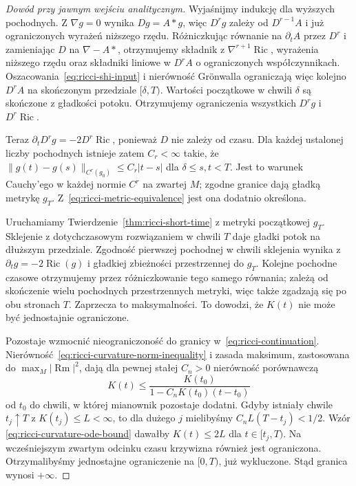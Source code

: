 \begin{proof}[Dowód przy jawnym wejściu analitycznym]
Wyjaśnijmy indukcję dla wyższych pochodnych. Z $\nabla g=0$
wynika $Dg=A*g$, więc $D^rg$ zależy od $D^{r-1}A$
i już ograniczonych wyrażeń niższego rzędu. Różniczkując
równanie na $\partial_tA$ przez $D^r$ i zamieniając $D$
na $\nabla-A*$, otrzymujemy składnik z
$\nabla^{r+1}\operatorname{Ric}$, wyrażenia niższego rzędu
oraz składniki liniowe w $D^rA$ o ograniczonych
współczynnikach. Oszacowania~\eqref{eq:ricci-shi-input}
i nierówność Grönwalla ograniczają więc kolejno
$D^rA$ na skończonym przedziale $[\delta,T)$.
Wartości początkowe w chwili $\delta$ są skończone
z gładkości potoku. Otrzymujemy ograniczenia wszystkich
$D^rg$ i $D^r\operatorname{Ric}$.

Teraz $\partial_tD^rg=-2D^r\operatorname{Ric}$, ponieważ
$D$ nie zależy od czasu. Dla każdej ustalonej liczby
pochodnych istnieje zatem $C_r<\infty$ takie, że
$\|g(t)-g(s)\|_{C^r(g_0)}\leq C_r|t-s|$ dla
$\delta\leq s,t<T$. Jest to warunek Cauchy'ego w każdej
normie $C^r$ na zwartej $M$; zgodne granice dają
gładką metrykę $g_T$. Z~\eqref{eq:ricci-metric-equivalence}
jest ona dodatnio określona.

Uruchamiamy Twierdzenie~\ref{thm:ricci-short-time}
z metryki początkowej $g_T$. Sklejenie z
dotychczasowym rozwiązaniem w chwili $T$
daje gładki potok na dłuższym przedziale. Zgodność
pierwszej pochodnej w chwili sklejenia wynika z
$\partial_tg=-2\operatorname{Ric}(g)$ i gładkiej
zbieżności przestrzennej do $g_T$. Kolejne pochodne
czasowe otrzymujemy przez różniczkowanie tego samego
równania; zależą od skończenie wielu pochodnych
przestrzennych metryki, więc także zgadzają się
po obu stronach $T$.
Zaprzecza to maksymalności. To dowodzi, że
$K(t)$ nie może być jednostajnie ograniczone.

Pozostaje wzmocnić nieograniczoność do
granicy w~\eqref{eq:ricci-continuation}.
Nierówność~\eqref{eq:ricci-curvature-norm-inequality}
i zasada maksimum, zastosowana do
$\max_M|\operatorname{Rm}|^2$, dają dla
pewnej stałej $C_n>0$ nierówność porównawczą
\begin{equation}\label{eq:ricci-curvature-ode-bound}
 K(t)\leq
 \frac{K(t_0)}
      {1-C_nK(t_0)(t-t_0)}
\end{equation}
od $t_0$ do chwili, w której mianownik
pozostaje dodatni. Gdyby istniały chwile
$t_j\uparrow T$ z $K(t_j)\leq L<\infty$,
to dla dużego $j$ mielibyśmy
$C_nL(T-t_j)<1/2$. Wzór
\eqref{eq:ricci-curvature-ode-bound}
dawałby $K(t)\leq2L$ dla $t\in[t_j,T)$.
Na wcześniejszym zwartym odcinku czasu
krzywizna również jest ograniczona. Otrzymalibyśmy
jednostajne ograniczenie na $[0,T)$,
już wykluczone. Stąd granica wynosi $+\infty$.
\end{proof}

